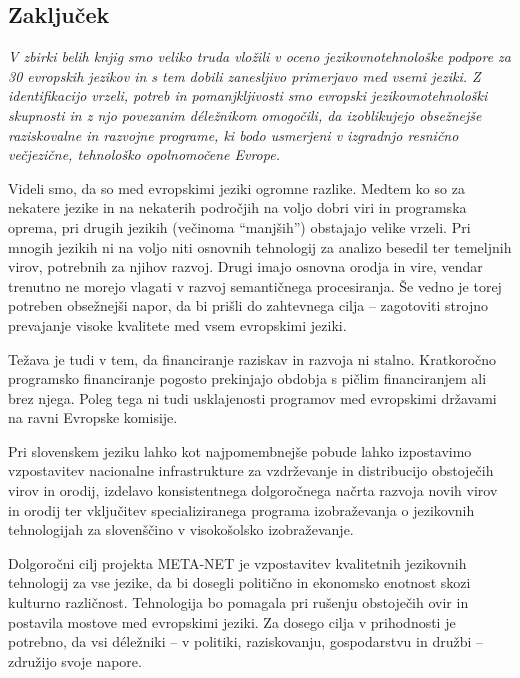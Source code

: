 \begin{multicols}{2}
\subsection{Zaključek}

\emph{V zbirki belih knjig smo veliko truda vložili v oceno jezikovnotehnološke podpore za 30 evropskih jezikov in s tem dobili zanesljivo primerjavo med vsemi jeziki. Z identifikacijo vrzeli, potreb in pomanjkljivosti smo evropski jezikovnotehnološki skupnosti in z njo povezanim déležnikom omogočili, da izoblikujejo obsežnejše raziskovalne in razvojne programe, ki bodo usmerjeni v izgradnjo resnično večjezične, tehnološko opolnomočene Evrope.}

Videli smo, da so med evropskimi jeziki ogromne razlike. Medtem ko so za nekatere jezike in na nekaterih področjih na voljo dobri viri in programska oprema, pri drugih jezikih (večinoma “manjših”) obstajajo velike vrzeli. Pri mnogih jezikih ni na voljo niti osnovnih tehnologij za analizo besedil ter temeljnih virov, potrebnih za njihov razvoj. Drugi imajo osnovna orodja in vire, vendar trenutno ne morejo vlagati v razvoj semantičnega procesiranja. Še vedno je torej potreben obsežnejši napor, da bi prišli do zahtevnega cilja – zagotoviti strojno prevajanje visoke kvalitete med vsem evropskimi jeziki.

Težava je tudi v tem, da financiranje raziskav in razvoja ni stalno. Kratkoročno programsko financiranje pogosto prekinjajo obdobja s pičlim financiranjem ali brez njega. Poleg tega ni tudi usklajenosti programov med evropskimi državami na ravni Evropske komisije.

Pri slovenskem jeziku lahko kot najpomembnejše pobude lahko izpostavimo vzpostavitev nacionalne infrastrukture za vzdrževanje in distribucijo obstoječih virov in orodij, izdelavo konsistentnega dolgoročnega načrta razvoja novih virov in orodij ter vključitev specializiranega programa izobraževanja o jezikovnih tehnologijah za slovenščino v visokošolsko izobraževanje.

Dolgoročni cilj projekta META-NET je vzpostavitev kvalitetnih jezikovnih tehnologij za vse jezike, da bi dosegli politično in ekonomsko enotnost skozi kulturno različnost. Tehnologija bo pomagala pri rušenju obstoječih ovir in postavila mostove med evropskimi jeziki. Za dosego cilja v prihodnosti  je potrebno, da vsi déležniki – v politiki, raziskovanju, gospodarstvu in družbi – združijo svoje napore.

\end{multicols}

